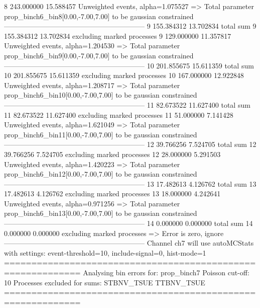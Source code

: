 8          243.000000      15.588457       Unweighted events, alpha=1.075527
  => Total parameter prop_binch6_bin8[0.00,-7.00,7.00] to be gaussian constrained
------------------------------------------------------------
9          155.384312      13.702834       total sum                     
9          155.384312      13.702834       excluding marked processes    
9          129.000000      11.357817       Unweighted events, alpha=1.204530
  => Total parameter prop_binch6_bin9[0.00,-7.00,7.00] to be gaussian constrained
------------------------------------------------------------
10         201.855675      15.611359       total sum                     
10         201.855675      15.611359       excluding marked processes    
10         167.000000      12.922848       Unweighted events, alpha=1.208717
  => Total parameter prop_binch6_bin10[0.00,-7.00,7.00] to be gaussian constrained
------------------------------------------------------------
11         82.673522       11.627400       total sum                     
11         82.673522       11.627400       excluding marked processes    
11         51.000000       7.141428        Unweighted events, alpha=1.621049
  => Total parameter prop_binch6_bin11[0.00,-7.00,7.00] to be gaussian constrained
------------------------------------------------------------
12         39.766256       7.524705        total sum                     
12         39.766256       7.524705        excluding marked processes    
12         28.000000       5.291503        Unweighted events, alpha=1.420223
  => Total parameter prop_binch6_bin12[0.00,-7.00,7.00] to be gaussian constrained
------------------------------------------------------------
13         17.482613       4.126762        total sum                     
13         17.482613       4.126762        excluding marked processes    
13         18.000000       4.242641        Unweighted events, alpha=0.971256
  => Total parameter prop_binch6_bin13[0.00,-7.00,7.00] to be gaussian constrained
------------------------------------------------------------
14         0.000000        0.000000        total sum                     
14         0.000000        0.000000        excluding marked processes    
  => Error is zero, ignore      
------------------------------------------------------------
Channel ch7 will use autoMCStats with settings: event-threshold=10, include-signal=0, hist-mode=1
============================================================
Analysing bin errors for: prop_binch7
Poisson cut-off: 10
Processes excluded for sums: STBNV_TSUE TTBNV_TSUE
============================================================
